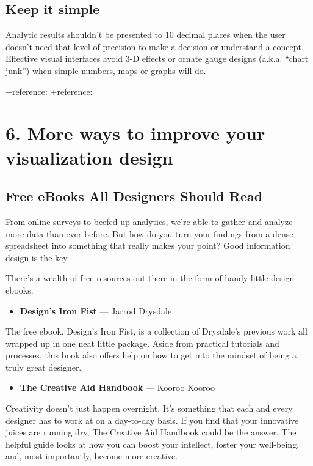 \documentclass[]{book}
\providecommand{\tightlist}{%
  \setlength{\itemsep}{0pt}\setlength{\parskip}{0pt}}
\theoremstyle{definition}
\theoremstyle{definition}
\theoremstyle{definition}
\theoremstyle{remark}
\begin{document}
\subsection{Keep it simple}\label{keep-it-simple}

Analytic results shouldn't be presented to 10 decimal places when the
user doesn't need that level of precision to make a decision or
understand a concept. Effective visual interfaces avoid 3-D effects or
ornate gauge designs (a.k.a. ``chart junk'') when simple numbers, maps
or graphs will do.

+reference: \citep{French} +reference: \citep{Steier}

\section{6. More ways to improve your visualization
design}\label{more-ways-to-improve-your-visualization-design}

\subsection{Free eBooks All Designers Should
Read}\label{free-ebooks-all-designers-should-read}

From online surveys to beefed-up analytics, we're able to gather and
analyze more data than ever before. But how do you turn your findings
from a dense spreadsheet into something that really makes your point?
Good information design is the key.

There's a wealth of free resources out there in the form of handy little
design ebooks.

\begin{itemize}
\tightlist
\item
  \textbf{Design's Iron Fist} --- Jarrod Drysdale
\end{itemize}

The free ebook, Design's Iron Fist, is a collection of Drysdale's
previous work all wrapped up in one neat little package. Aside from
practical tutorials and processes, this book also offers help on how to
get into the mindset of being a truly great designer.

\begin{itemize}
\tightlist
\item
  \textbf{The Creative Aid Handbook} --- Kooroo Kooroo
\end{itemize}

Creativity doesn't just happen overnight. It's something that each and
every designer has to work at on a day-to-day basis. If you find that
your innovative juices are running dry, The Creative Aid Handbook could
be the answer. The helpful guide looks at how you can boost your
intellect, foster your well-being, and, most importantly, become more
creative.
\end{document}
